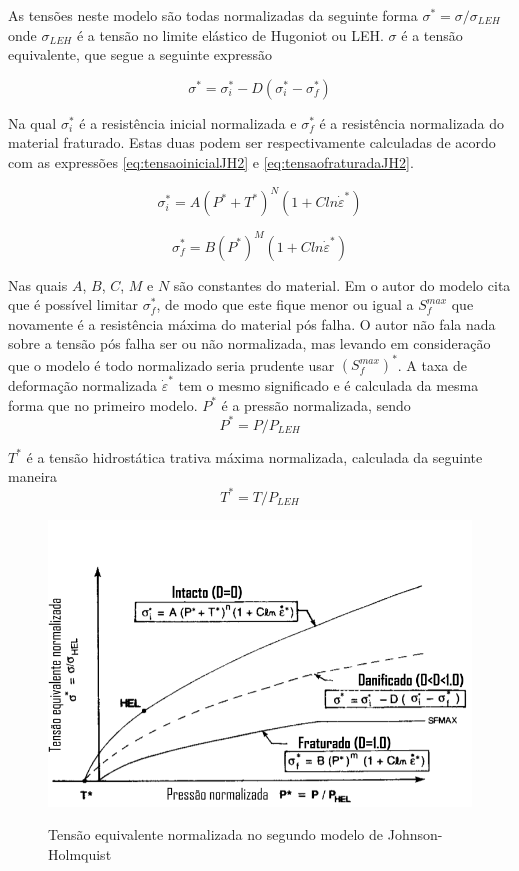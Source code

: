As tensões neste modelo são todas normalizadas da seguinte forma $ \sigma^* = \sigma/\sigma_{LEH} $ onde $ \sigma_{LEH} $ é a tensão no limite elástico de Hugoniot ou LEH. $ \sigma $ é a tensão equivalente, que segue a seguinte expressão

\begin{equation} \label{eq:JH2tensao}
    \sigma^* = \sigma^*_i - D(\sigma^*_i - \sigma^*_f)
\end{equation}

Na qual $ \sigma^*_i $ é a resistência inicial normalizada e $ \sigma^*_f $ é a resistência normalizada do material fraturado. Estas duas podem ser respectivamente calculadas de acordo com as expressões \ref{eq:tensaoinicialJH2} e \ref{eq:tensaofraturadaJH2}.

\begin{equation} \label{eq:tensaoinicialJH2}
    \sigma^*_i = A(P^* + T^*)^N (1 + C ln\dot{\varepsilon}^*)
\end{equation}

\begin{equation}
    \sigma^*_f = B(P^*)^M(1 + Cln\dot{\varepsilon}^*)
\end{equation}

Nas quais $A$, $B$, $C$, $M$ e $N$ são constantes do material. Em  \cite{johnson_holmquist_1994} o autor do modelo cita que é possível limitar $ \sigma^*_f $, de modo que este fique menor ou igual a $ S^{max}_f $ que novamente é a resistência máxima do material pós falha. O autor não fala nada sobre a tensão pós falha ser ou não normalizada, mas levando em consideração que o modelo é todo normalizado seria prudente usar $ (S^{max}_f)^*$. 
A taxa de deformação normalizada $ \dot{\varepsilon}^* $ tem o mesmo significado e é calculada da mesma forma que no primeiro modelo. $ P^* $ é a pressão normalizada, sendo \begin{equation}
    P^* = P/ P_{LEH} 
\end{equation}  

$ T^* $ é a tensão hidrostática trativa máxima normalizada, calculada da seguinte maneira \begin{equation}
    T^* = T/P_{LEH} 
\end{equation}   
\begin{figure}
    \centering
    \caption{Tensão equivalente normalizada no segundo modelo de Johnson-Holmquist}
    \includegraphics[width=0.7\linewidth]{images/sigmapressaoJH2.png}
    \label{fig:JH2tensao}
\end{figure}


